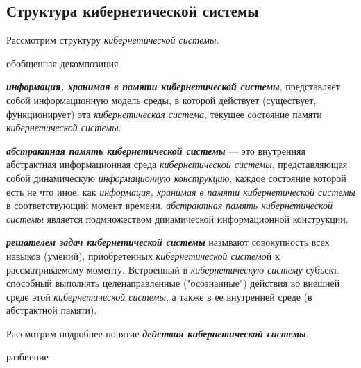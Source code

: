 \subsection{Структура кибернетической системы}
{\label{sec_cyb_syst_structure}} 

Рассмотрим структуру \textit{кибернетической системы}.
\begin{SCn}
	\begin{scnrelfromset}{обобщенная декомпозиция}
	\end{scnrelfromset}
\end{SCn}

\textbf{\textit{информация, хранимая в памяти \textit{кибернетической системы}}}, представляет собой информационную модель среды, в которой действует (существует, функционирует) эта \textit{кибернетическая система}, текущее состояние памяти \textit{кибернетической системы}.

\textbf{\textit{абстрактная память кибернетической системы}} --- это внутренняя абстрактная информационная среда \textit{кибернетической системы}, представляющая собой динамическую \textit{информационную конструкцию}, каждое состояние которой есть не что иное, как \textit{информация, хранимая в памяти кибернетической системы} в соответствующий момент времени. \textit{абстрактная память кибернетической системы} является подмножеством динамической информационной конструкции.

\textbf{\textit{решателем задач кибернетической системы}} называют совокупность всех навыков (умений), приобретенных \textit{кибернетической системо}й к рассматриваемому моменту. Встроенный в \textit{кибернетическую систему} субъект, способный выполнять целенаправленные ("осознанные") действия во внешней среде этой \textit{кибернетической системы}, а также в ее внутренней среде (в абстрактной памяти).

Рассмотрим подробнее понятие \textbf{\textit{действия кибернетической системы}}.

\begin{SCn}
\begin{scnrelfromset}{разбиение}
	\begin{scnindent}
	\end{scnindent}

\end{scnrelfromset}
\end{SCn}

